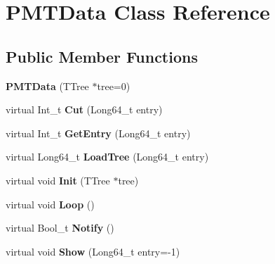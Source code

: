 \hypertarget{classPMTData}{\section{P\-M\-T\-Data Class Reference}
\label{classPMTData}
}
\subsection*{Public Member Functions}
\begin{DoxyCompactItemize}
\item 
\hypertarget{classPMTData_a9fb3e9a250f7d6f53ffd3cd486a6c9ca}{{\bfseries P\-M\-T\-Data} (T\-Tree $\ast$tree=0)}\label{classPMTData_a9fb3e9a250f7d6f53ffd3cd486a6c9ca}

\item 
\hypertarget{classPMTData_a0cf2a15f7744461d4c8bd17cb4db137f}{virtual Int\-\_\-t {\bfseries Cut} (Long64\-\_\-t entry)}\label{classPMTData_a0cf2a15f7744461d4c8bd17cb4db137f}

\item 
\hypertarget{classPMTData_a6dab05455fd037572c5a84cf327a8c3c}{virtual Int\-\_\-t {\bfseries Get\-Entry} (Long64\-\_\-t entry)}\label{classPMTData_a6dab05455fd037572c5a84cf327a8c3c}

\item 
\hypertarget{classPMTData_a3028ede291824df9edf4deb0e89544f7}{virtual Long64\-\_\-t {\bfseries Load\-Tree} (Long64\-\_\-t entry)}\label{classPMTData_a3028ede291824df9edf4deb0e89544f7}

\item 
\hypertarget{classPMTData_a6656d88834a7664ed4fb2d71dc449f6c}{virtual void {\bfseries Init} (T\-Tree $\ast$tree)}\label{classPMTData_a6656d88834a7664ed4fb2d71dc449f6c}

\item 
\hypertarget{classPMTData_a109253ff2e9aee1cb5bbb25627212c34}{virtual void {\bfseries Loop} ()}\label{classPMTData_a109253ff2e9aee1cb5bbb25627212c34}

\item 
\hypertarget{classPMTData_a6654e69eab88c44a80565d0041a0311f}{virtual Bool\-\_\-t {\bfseries Notify} ()}\label{classPMTData_a6654e69eab88c44a80565d0041a0311f}

\item 
\hypertarget{classPMTData_a0d36b24d72edcc6afa8eee848246ecb0}{virtual void {\bfseries Show} (Long64\-\_\-t entry=-\/1)}\label{classPMTData_a0d36b24d72edcc6afa8eee848246ecb0}

\end{DoxyCompactItemize}
